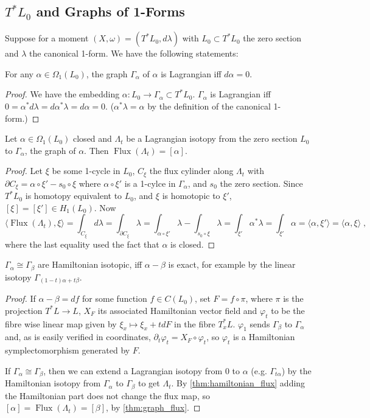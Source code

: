 \documentclass[12pt,a4paper,draft]{scrartcl}
\DeclareMathOperator{\Flux}{Flux}
\begin{document}
\subsection{\texorpdfstring{$T^* L_0$}{T*L} and Graphs of 1-Forms} 

Suppose for a moment $(X,ω)=(T^* L_0,d λ)$ with $L_0 ⊂ T^* L_0$ the zero section and $λ$ the canonical 1-form. We have the following statements:

\begin{lemma}
  \label{thm:graph_lagrangian}
  For any $α ∈ Ω_1(L_0)$, the graph $Γ_α$ of $α$ is Lagrangian iff $d α=0$.
\end{lemma}
\begin{proof}
  We have the embedding $α \colon L_0 → Γ_α ⊂ T^* L_0$. $Γ_α$ is Lagrangian iff $0 = α^* d λ = d α^* λ = d α = 0$. ($α^* λ = α$ by the definition of the canonical 1-form.)
\end{proof}

\begin{lemma}
  \label{thm:graph_flux}
  Let $α ∈ Ω_1(L_0)$ closed and $Λ_t$ be a Lagrangian isotopy from the zero section $L_0$ to $Γ_α$, the graph of $α$. Then $\Flux(Λ_t) = [α]$.
\end{lemma}
\begin{proof}
  Let $ξ$ be some 1-cycle in $L_0$, $C_ξ$ the flux cylinder along $Λ_t$ with $∂C_ξ = α ∘ ξ' - s_0 ∘ ξ$ where $α ∘ ξ'$ is a 1-cylce in $Γ_α$, and $s_0$ the zero section.
  Since $T^* L_0$ is homotopy equivalent to $L_0$, and $ξ$ is homotopic to $ξ'$, $[ξ] = [ξ'] ∈ H_1(L_0)$.
  Now
  \[⟨\Flux(Λ_t),ξ ⟩ = ∫_{C_ξ} dλ = ∫_{∂C_ξ} λ = ∫_{α ∘ ξ'}λ - ∫_{s_0 ∘ ξ} λ = ∫_{ξ'} α^* λ = ∫_{ξ'} α = ⟨α,ξ'⟩ = ⟨α,ξ⟩ \; ,\]
  where the last equality used the fact that $α$ is closed.
\end{proof}

\begin{lemma}
  \label{thm:graph_hamiltonian_isotopic}
  $Γ_α ≅ Γ_β$ are Hamiltonian isotopic, iff $α-β$ is exact, for example by the linear isotopy $Γ_{(1-t)α + t β}$.
\end{lemma}
\begin{proof}
  If $α-β = d f$ for some function $f ∈ C(L_0)$, set $F = f ∘ π$, where $π$ is the projection $T^*L → L$, $X_F$ its associated Hamiltonian vector field and $φ_t$ to be the fibre wise linear map given by $ξ_x ↦  ξ_x + tdF$ in the fibre $T_x^*L$.
  $φ_1$ sends $Γ_β$ to $Γ_α$ and, as is easily verified in coordinates, $∂_t φ_t = X_F ∘ φ_t$, so $φ_t$ is a Hamiltonian symplectomorphism generated by $F$.

  If $Γ_α ≅ Γ_β$, then we can extend a Lagrangian isotopy from $0$ to $α$ (e.g. $Γ_{tα}$) by the Hamiltonian isotopy from $Γ_α$ to $Γ_β$ to get $Λ_t$. By \cref{thm:hamiltonian_flux} adding the Hamiltonian part does not change the flux map, so $[α] = \Flux(Λ_t) = [β]$, by \cref{thm:graph_flux}.
\end{proof}
\end{document}

